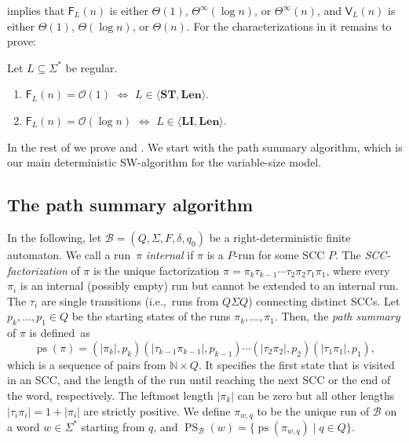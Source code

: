 \documentclass{theoretics}
\newcommand{\N}{\mathbb{N}}
\newcommand{\B}{\mathcal{B}}
\renewcommand{\O}{\mathcal{O}}
\newcommand{\F}{\mathsf{F}}
\newcommand{\V}{\mathsf{V}}
\DeclareMathOperator{\ps}{ps}
\DeclareMathOperator{\PS}{PS}
\newcommand{\Len}{\mathbf{Len}}
\newcommand{\LI}{\mathbf{LI}}
\newcommand{\ST}{\mathbf{ST}}
\newcommand{\Thetainf}{\Theta^{\scriptscriptstyle{\infty}}}
\begin{document}
 implies that 
$\F_L(n)$ is either $\Theta(1)$, $\Thetainf(\log n)$, or $\Thetainf(n)$,
and 
$\V_L(n)$ is either $\Theta(1)$, $\Theta(\log n)$, or $\Theta(n)$.
For the characterizations in  it remains to prove:

\begin{theorem}
	\label{thm:characterization}
	Let $L \subseteq \Sigma^*$ be regular.
	\begin{enumerate}[label=(\roman{*}), ref=(\roman{*})]
		\item $\F_L(n) = \O(1)$ $\iff$ $L \in \langle \ST, \Len \rangle$.
		\label{item:const}
		\item $\F_L(n) = \O(\log n)$ $\iff$ $L \in \langle \LI, \Len \rangle$.
		\label{item:log}
	\end{enumerate}	
\end{theorem}
In the rest of  we prove  and .
We start with the path summary algorithm, which is our main deterministic SW-algorithm for the variable-size model.

\subsection{The path summary algorithm}

\label{subsec:pathsummary}


In the following, let $\B = (Q,\Sigma,F,\delta,q_0)$ be a right-deterministic finite automaton.
We call a run~$\pi$ {\em internal} if $\pi$ is a $P$-run for some SCC $P$.
The {\em SCC-factorization} of $\pi$ is the unique factorization
$\pi = \pi_k \tau_{k-1} \cdots \tau_2 \pi_2 \tau_1 \pi_1$, where every $\pi_i$ is an internal
(possibly empty) run but cannot be extended to an internal run. The $\tau_i$ are single transitions
(i.e.,~runs from $Q \Sigma Q$) connecting distinct SCCs.
Let $p_k, \dots, p_1 \in Q$ be the starting states of the runs $\pi_k, \dots, \pi_1$.
Then, the {\em path summary} of $\pi$ is defined~as
\[
	\ps(\pi) = (|\pi_k|,p_k) (|\tau_{k-1} \pi_{k-1}|,p_{k-1}) \cdots (|\tau_2 \pi_2|,p_2) (|\tau_1 \pi_1|,p_1),
\]
which is a sequence of pairs from $\N \times Q$.
It specifies the first state that is visited in an SCC,
and the length of the run until reaching the next SCC or the end of the word, respectively.
The leftmost length $|\pi_k|$ can be zero but all other lengths $|\tau_i \pi_i| = 1+|\pi_i|$ are strictly positive.
We define $\pi_{w,q}$ to be the unique run of $\B$ on a word $w \in \Sigma^*$ starting from $q$,
and $\PS_\B(w) = \{\ps(\pi_{w,q}) \mid q \in Q\}$.
\end{document}
